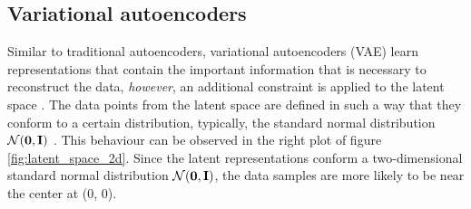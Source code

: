 \subsection{Variational autoencoders}

Similar to traditional autoencoders, variational autoencoders (VAE) learn representations that contain the important information that is necessary to reconstruct the data, \textit{however}, an additional constraint is applied to the latent space \cite{doerschTutorialVariationalAutoencoders2021, davidfosterVariationalAutoencoders2023, kingmaAutoEncodingVariationalBayes2022, kingmaIntroductionVariationalAutoencoders2019, cinelliVariationalMethodsMachine2021}. The data points from the latent space are defined in such a way that they conform to a certain distribution, typically, the standard normal distribution $\mathcal{N}(\bm{\mathbf{0}}, \mathbf{I})$ \cite{davidfosterVariationalAutoencoders2023}. %
This behaviour can be observed in the right plot of figure \ref{fig:latent_space_2d}. Since the latent representations conform a two-dimensional standard normal distribution $\mathcal{N}(\bm{\mathbf{0}}, \mathbf{I})$, the data samples are more likely to be near the center at (0, 0).


%
%





